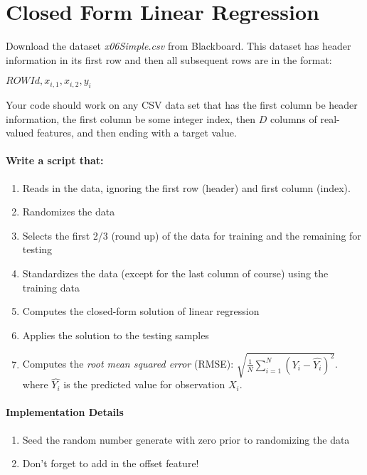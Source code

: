 \documentclass[12pt]{article}
\begin{document}
\newpage
\section{Closed Form Linear Regression}\label{linreg}
Download the dataset \emph{x06Simple.csv} from Blackboard.  This dataset has header information in its first row and then all subsequent rows are in the format:
\begin{center}
$ROWId, x_{i,1}, x_{i,2}, y_i$
\end{center}
Your code should work on any CSV data set that has the first column be header information, the first column be some integer index, then $D$ columns of real-valued features, and then ending with a target value.\\

\noindent
\paragraph{Write a script that:}
\begin{enumerate}
  \item Reads in the data, ignoring the first row (header) and first column (index).
  \item Randomizes the data
  \item Selects the first 2/3 (round up) of the data for training and the remaining for testing
  \item Standardizes the data (except for the last column of course) using the training data
  \item Computes the closed-form solution of linear regression
  \item Applies the solution to the testing samples
 \item Computes the \emph{root mean squared error} (RMSE): $\sqrt{\frac{1}{N}\sum_{i=1}^N (Y_i-\hat{Y_i})^2}$. where $\hat{Y_i}$ is the predicted value for observation $X_i$.
\end{enumerate}


\paragraph{Implementation Details}
\begin{enumerate}
\item Seed the random number generate with zero prior to randomizing the data
\item Don't forget to add in the offset feature!
\end{enumerate}
\end{document}
